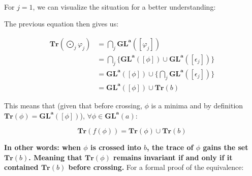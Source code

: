 \documentclass[a4paper, 11pt]{article}
\begin{document}
\

For $j = 1$, we can visualize the situation for a better understanding:

\begin{center}
\end{center}

The previous equation then gives us:

\begin{align*}
    \textbf{Tr}(\bigodot_j \varphi_j) &= \bigcap_j \boldsymbol{GL}^{\boldsymbol{a}}([\varphi_j]) \\
    &= \bigcap_j \{ \boldsymbol{GL}^{\boldsymbol{a}}([\phi]) \cup \boldsymbol{GL}^{\boldsymbol{a}}([\epsilon_j])\} \\
    &= \boldsymbol{GL}^{\boldsymbol{a}}([\phi]) \cup \{ \bigcap_j \boldsymbol{GL}^{\boldsymbol{a}}([\epsilon_j])\} \\
    &= \boldsymbol{GL}^{\boldsymbol{a}}([\phi]) \cup \textbf{Tr}(b) 
\end{align*}

This means that (given that before crossing, $\phi$ is a minima and by definition $\textbf{Tr}(\phi) = \boldsymbol{GL}^{\boldsymbol{a}}([\phi])$), $\forall \phi \in  \boldsymbol{GL}^{\boldsymbol{a}}(a)$:

\begin{equation*}
    \textbf{Tr}(f(\phi)) = \textbf{Tr}(\phi) \cup \textbf{Tr}(b)
\end{equation*}

\textbf{In other words: when $\phi$ is crossed into $b$, the trace of $\phi$ gains the set $\textbf{Tr}(b)$. Meaning that $\textbf{Tr}(\phi)$ remains invariant if and only if it contained $\textbf{Tr}(b)$ before crossing.} For a formal proof of the equivalence:
\end{document}
